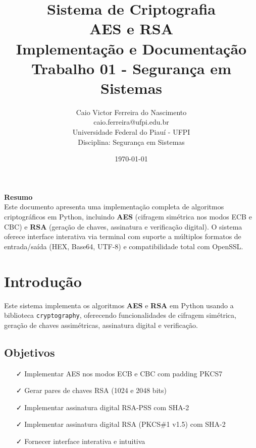 \documentclass[12pt,a4paper]{article}
\title{
    \Huge\textbf{\color{primaryblue}Sistema de Criptografia}\\
    \vspace{5mm}
    \Large\textbf{AES e RSA}\\
    \vspace{3mm}
    \large Implementação e Documentação\\
    \vspace{2mm}
    \normalsize Trabalho 01 - Segurança em Sistemas
}
\author{
    \large Caio Victor Ferreira do Nascimento\\
    \normalsize caio.ferreira@ufpi.edu.br\\
    \normalsize Universidade Federal do Piauí - UFPI\\
    \normalsize Disciplina: Segurança em Sistemas
}
\date{\today}
\begin{document}
\maketitle
\thispagestyle{empty}

\vspace{15mm}
\begin{center}
\begin{tcolorbox}[width=0.85\textwidth,colback=primaryblue!5,colframe=primaryblue,arc=5mm]
\centering
\Large\textbf{Resumo}\\
\vspace{3mm}
\normalsize
Este documento apresenta uma implementação completa de algoritmos criptográficos em Python, incluindo \textbf{AES} (cifragem simétrica nos modos ECB e CBC) e \textbf{RSA} (geração de chaves, assinatura e verificação digital). O sistema oferece interface interativa via terminal com suporte a múltiplos formatos de entrada/saída (HEX, Base64, UTF-8) e compatibilidade total com OpenSSL.
\end{tcolorbox}
\end{center}

\newpage

\section{Introdução}

Este sistema implementa os algoritmos \textbf{AES} e \textbf{RSA} em Python usando a biblioteca \texttt{cryptography}, oferecendo funcionalidades de cifragem simétrica, geração de chaves assimétricas, assinatura digital e verificação.

\subsection{Objetivos}

\begin{itemize}[leftmargin=*]
    \item[\faCheck] Implementar AES nos modos ECB e CBC com padding PKCS7
    \item[\faCheck] Gerar pares de chaves RSA (1024 e 2048 bits)
    \item[\faCheck] Implementar assinatura digital RSA-PSS com SHA-2
    \item[\faCheck] Implementar assinatura digital RSA (PKCS\#1 v1.5) com SHA-2
    \item[\faCheck] Fornecer interface interativa e intuitiva
\end{itemize}
\end{document}
